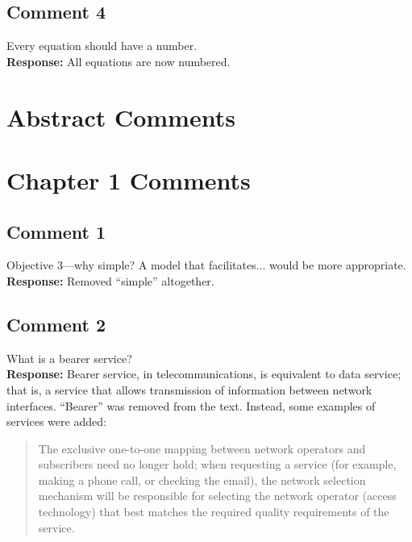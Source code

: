 \documentclass[10pt,a4paper,notitlepage]{article}
\numberwithin{equation}{section}
\begin{document}
\subsection{Comment 4}
Every equation should have a number.\\[-2ex]

\textbf{Response:}
All equations are now numbered.

\clearpage

\setcounter{section}{0}
\renewcommand{\thesection}{A}
\renewcommand{\thesubsection}{A\arabic{subsection}}
\section{Abstract Comments}

\clearpage

\setcounter{section}{0}
\renewcommand{\thesection}{C\arabic{section}}
\renewcommand{\thesubsection}{C\arabic{section}.\arabic{subsection}}
\section{Chapter 1 Comments}
\subsection{Comment 1}
Objective 3---why simple? A model that facilitates... would be more appropriate.\\[-2ex]

\textbf{Response:}
Removed ``simple'' altogether.

\subsection{Comment 2}
What is a bearer service?\\[-2ex]

\textbf{Response:}
Bearer service, in telecommunications, is equivalent to data service; that is, a service that allows transmission of information between network interfaces. ``Bearer'' was removed from the text. Instead, some examples of services were added:
\begin{quote}
The exclusive one-to-one mapping between network operators and subscribers need no longer hold; when requesting a service (for example, making a phone call, or checking the email), the network selection mechanism will be responsible for selecting the network operator (access technology) that best matches the required quality requirements of the service.
\end{quote}
\end{document}
